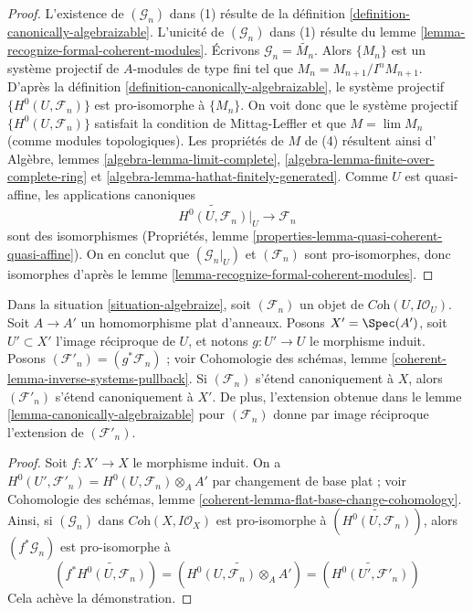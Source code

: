 \begin{proof}
L'existence de $(\mathcal{G}_n)$ dans (1) résulte de la
définition \ref{definition-canonically-algebraizable}.
L'unicité de $(\mathcal{G}_n)$ dans (1) résulte du
lemme \ref{lemma-recognize-formal-coherent-modules}.
Écrivons $\mathcal{G}_n = \widetilde{M_n}$.
Alors $\{M_n\}$ est un système projectif de $A$-modules de type fini
tel que $M_n = M_{n + 1}/I^n M_{n + 1}$.
D'après la définition \ref{definition-canonically-algebraizable},
le système projectif $\{H^0(U, \mathcal{F}_n)\}$
est pro-isomorphe à $\{M_n\}$.
On voit donc que le système projectif $\{H^0(U, \mathcal{F}_n)\}$
satisfait la condition de Mittag-Leffler et que
$M = \lim M_n$ (comme modules topologiques).
Les propriétés de $M$ de (4) résultent ainsi d'
Algèbre, lemmes \ref{algebra-lemma-limit-complete},
\ref{algebra-lemma-finite-over-complete-ring} et
\ref{algebra-lemma-hathat-finitely-generated}.
Comme $U$ est quasi-affine, les applications canoniques
$$
\widetilde{H^0(U, \mathcal{F}_n)}|_U \to \mathcal{F}_n
$$
sont des isomorphismes (Propriétés, lemme
\ref{properties-lemma-quasi-coherent-quasi-affine}).
On en conclut que $(\mathcal{G}_n|_U)$ et $(\mathcal{F}_n)$ sont
pro-isomorphes, donc isomorphes d'après le
lemme \ref{lemma-recognize-formal-coherent-modules}.
\end{proof}

\begin{lemma}
\label{lemma-canonically-extend-base-change}
Dans la situation \ref{situation-algebraize}, soit $(\mathcal{F}_n)$ un
objet de $\textit{Coh}(U, I\mathcal{O}_U)$. Soit $A \to A'$ un homomorphisme plat
d'anneaux. Posons $X' = \Spec(A')$, soit $U' \subset X'$ l'image réciproque de $U$,
et notons $g : U' \to U$ le morphisme induit. Posons
$(\mathcal{F}'_n) = (g^*\mathcal{F}_n)$ ; voir
Cohomologie des schémas, lemme \ref{coherent-lemma-inverse-systems-pullback}.
Si $(\mathcal{F}_n)$ s'étend canoniquement à $X$, alors
$(\mathcal{F}'_n)$ s'étend canoniquement à $X'$.
De plus, l'extension obtenue dans le lemme \ref{lemma-canonically-algebraizable}
pour $(\mathcal{F}_n)$ donne par image réciproque l'extension de
$(\mathcal{F}'_n)$.
\end{lemma}

\begin{proof}
Soit $f : X' \to X$ le morphisme induit.
On a $H^0(U', \mathcal{F}'_n) = H^0(U, \mathcal{F}_n) \otimes_A A'$ par
changement de base plat ; voir Cohomologie des schémas, lemme
\ref{coherent-lemma-flat-base-change-cohomology}.
Ainsi, si $(\mathcal{G}_n)$ dans $\textit{Coh}(X, I\mathcal{O}_X)$
est pro-isomorphe à $(\widetilde{H^0(U, \mathcal{F}_n)})$, alors
$(f^*\mathcal{G}_n)$ est pro-isomorphe à
$$
(f^*\widetilde{H^0(U, \mathcal{F}_n)}) =
(\widetilde{H^0(U, \mathcal{F}_n) \otimes_A A'}) =
(\widetilde{H^0(U', \mathcal{F}'_n)})
$$
Cela achève la démonstration.
\end{proof}


